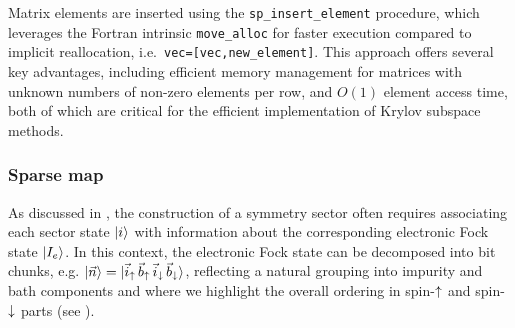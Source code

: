 \documentclass[edipack_sp.tex]{subfiles}
\begin{document}

Matrix elements are inserted using the 
{\tt sp\_insert\_element} procedure, which leverages the Fortran 
intrinsic {\tt move\_alloc} for faster execution compared to 
implicit reallocation, i.e.~{\tt vec=[vec,new\_element]}. 
%
This approach offers several key advantages, including efficient 
memory management for matrices with unknown numbers of non-zero 
elements per row, and $O(1)$ element access time, both of which 
are critical for the efficient implementation of Krylov subspace 
methods.



\subsubsection{Sparse map}\label{CodeSparseMap}
As discussed in , the construction of a symmetry 
sector often requires associating each sector state $|i\rangle$ with 
information about the corresponding electronic Fock state $|I_e\rangle$. 
In this context, the electronic Fock state can be decomposed into bit chunks, 
e.g. $|\vec{n}\rangle = |\vec{i}_\uparrow\,\vec{b}_\uparrow\,
\vec{i}_\downarrow\,\vec{b}_\downarrow\rangle$, reflecting a natural grouping into impurity 
and bath components and where we highlight the overall ordering in
spin-$\uparrow$ and spin-$\downarrow$ parts (see ).
\end{document}
